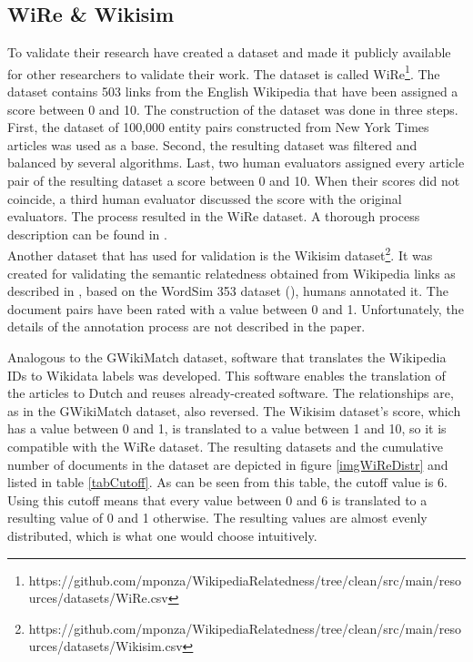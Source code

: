\subsection{WiRe \& Wikisim}
\label{sectWiReWikisim}
To validate their research \citet{Ponza2017} have created a dataset and made it publicly available for other researchers to validate their work. The dataset is called WiRe\footnote{https://github.com/mponza/WikipediaRelatedness/tree/clean/src/main/resources/datasets/WiRe.csv}. The dataset contains 503 links from the English Wikipedia that have been assigned a score between 0 and 10. The construction of the dataset was done in three steps. First, the dataset of 100,000 entity pairs constructed from New York Times articles \citep{Dunietz2014} was used as a base. Second, the resulting dataset was filtered and balanced by several algorithms. Last, two human evaluators assigned every article pair of the resulting dataset a score between 0 and 10. When their scores did not coincide, a third human evaluator discussed the score with the original evaluators. The process resulted in the WiRe dataset. A thorough process description can be found in \citep{Ponza2017}.\\

Another dataset that \citet{Ponza2017} has used for validation is the Wikisim dataset\footnote{https://github.com/mponza/WikipediaRelatedness/tree/clean/src/main/resources/datasets/Wikisim.csv}. It was created for validating the semantic relatedness obtained from Wikipedia links as described in \citep{Witten2008}, based on the WordSim 353 dataset (\citep{word353}), humans annotated it. The document pairs have been rated with a value between 0 and 1. Unfortunately, the details of the annotation process are not described in the paper.

Analogous to the GWikiMatch dataset, software that translates the Wikipedia IDs to Wikidata labels was developed. This software enables the translation of the articles to Dutch and reuses already-created software. The relationships are, as in the GWikiMatch dataset, also reversed. The Wikisim dataset's score, which has a value between 0 and 1, is translated to a value between 1 and 10, so it is compatible with the WiRe dataset. The resulting datasets and the cumulative number of documents in the dataset are depicted in figure \ref{imgWiReDistr} and listed in table \ref{tabCutoff}. As can be seen from this table, the cutoff value is 6. Using this cutoff means that every value between 0 and 6 is translated to a resulting value of 0 and 1 otherwise. The resulting values are almost evenly distributed, which is what one would choose intuitively.


